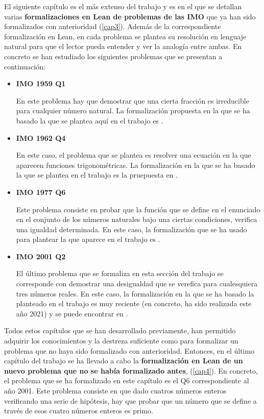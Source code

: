 El siguiente capítulo es el más extenso del trabajo y es en el que se
detallan varias \textbf{formalizaciones en Lean de problemas de las IMO}
que ya han sido formalizados con anterioridad (\ref{cap3}). Además de la
correspondiente formalización en Lean, en cada problema se plantea su
resolución en lenguaje natural para que el lector pueda entender y ver
la analogía entre ambas. En concreto se han estudiado los siguientes
problemas que se presentan a continuación:
\begin{itemize}
\item \textbf{IMO 1959 Q1}

  En este problema hay que demostrar que una cierta fracción es irreducible
  para cualquier número natural. La formalización propuesta en la que se ha
  basado la que se plantea aquí en el trabajo es \cite{KL}.

\item \textbf{IMO 1962 Q4}

  En este caso, el problema que se plantea es resolver una ecuación en la que
  aparecen funciones trigonométricas. La formalización en la que se ha basado
  la que se plantea en el trabajo es la pruepuesta en \cite{KLHM}.

\item \textbf{IMO 1977 Q6}

  Este problema consiste en probar que la función que se define en el enunciado
  en el conjunto de los números naturales bajo una ciertas condiciones, verifica
  una igualdad determinada. En este caso, la formalización que se ha usado
  para plantear la que aparece en el trabajo es \cite{TC}.


\item \textbf{IMO 2001 Q2}

  El último problema que se formaliza en esta sección del trabajo se corresponde
  con demostrar una desigualdad que se verefica para cualesquiera tres números
  reales. En este caso, la formalización en la que se ha basado la planteado
  en el trabajo es muy reciente (en concreto, ha sido realizada este año 2021)
  y se puede encontrar en \cite{TCC}.
\end{itemize}


Todos estos capítulos que se han desarrollado previamente, han permitido
adquirir los conocimientos y la destreza suficiente como para formalizar un
problema que no haya sido formalizado con anterioridad. Entonces, en el último
capítulo del trabajo se ha llevado a cabo la \textbf{
formalización en Lean de un nuevo problema que no se había formalizado antes},
(\ref{cap4}). En concreto, el problema que se ha formalizado en este capítulo es
el Q6 correspondiente al año 2001. Este problema consiste en que dado cuatros
números enteros verificando una serie de hipótesis, hay que probar que un
número que se define a través de esos cuatro números enteros es primo.

